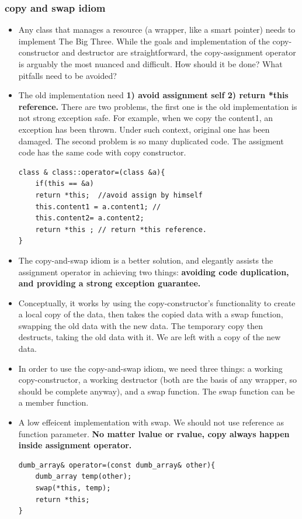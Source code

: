 \documentclass[a4paper,11pt,twoside]{book}
\begin{document}
\subsubsection{copy and swap idiom}
\begin{itemize}
	\item Any class that manages a resource (a wrapper, like a smart pointer) needs to implement The Big Three. While the goals and implementation of the copy-constructor and destructor are straightforward, the copy-assignment operator is arguably the most nuanced and difficult. How should it be done? What pitfalls need to be avoided?
	
	\item The old implementation need  \textbf{1) avoid assignment self 2) return *this reference. }There are two problems, the first one is the old implementation is not strong exception safe. For example, when we copy the content1, an exception has been thrown. Under such context, original one has been damaged. The second problem is so many duplicated code. The assigment code has the same code with copy constructor.
\begin{lstlisting}[numbers=none]
class & class::operator=(class &a){
	if(this == &a)
	return *this;  //avoid assign by himself
    this.content1 = a.content1; //
    this.content2= a.content2; 
	return *this ; // return *this reference.
}	
\end{lstlisting}
	
	\item The copy-and-swap idiom is a better solution, and elegantly assists the assignment operator in achieving two things: \textbf{avoiding code duplication, and providing a strong exception guarantee.}
	
	\item Conceptually, it works by using the copy-constructor's functionality to create a local copy of the data, then takes the copied data with a swap function, swapping the old data with the new data. The temporary copy then destructs, taking the old data with it. We are left with a copy of the new data.
	
	\item In order to use the copy-and-swap idiom, we need three things: a working copy-constructor, a working destructor (both are the basis of any wrapper, so should be complete anyway), and a swap function. The swap function can be a member function.
    \item A low effeicent implementation with swap. We should not use reference as function parameter. \textbf{No matter lvalue or rvalue, copy always happen inside assignment operator.}
\begin{lstlisting}[numbers=none]
dumb_array& operator=(const dumb_array& other){
	dumb_array temp(other);
	swap(*this, temp);
	return *this;
}	


\end{lstlisting}
\end{itemize}
\end{document}
